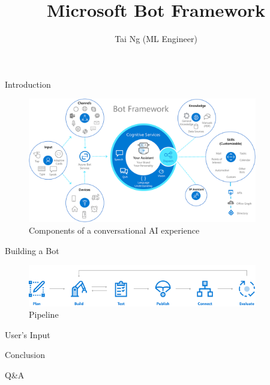 \documentclass[10pt]{beamer}
\title{Microsoft Bot Framework}
\author{Tai Ng (ML Engineer)}
\institute{VINBRAIN INTERNSHIP PROGRAM 2021 }
\begin{document}
\maketitle

\begin{frame}{Introduction}
    \begin{figure}[H]
	\centering
	\includegraphics[width=10cm]{image/BotFrameworkDiagram.png}\par
	\caption{Components of a conversational AI experience}
	\label{fig:intro_bot}
    \end{figure}
\end{frame}

\begin{frame}{Building a Bot}
    \begin{figure}[H]
	\centering
	\includegraphics[width=10cm]{image/bot-service-overview.png}\par
	\caption{Pipeline}
	\label{fig:pipeline}
    \end{figure}
\end{frame}

\begin{frame}{User's Input}
	
\end{frame}

\begin{frame}{Conclusion}
    \begin{center}
        Q\&A
    \end{center}
\end{frame}
\end{document}
